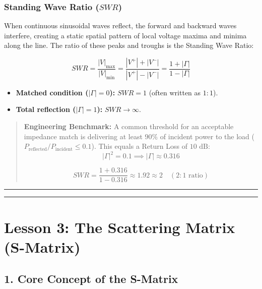 \documentclass[
]{article}
\providecommand{\tightlist}{%
  \setlength{\itemsep}{0pt}\setlength{\parskip}{0pt}}
\begin{document}
\subsubsection{\texorpdfstring{Standing Wave Ratio
(\(SWR\))}{Standing Wave Ratio (SWR)}}\label{standing-wave-ratio-swr}

When continuous sinusoidal waves reflect, the forward and backward waves
interfere, creating a static spatial pattern of local voltage maxima and
minima along the line. The ratio of these peaks and troughs is the
Standing Wave Ratio:

\[SWR = \frac{|V|_{\text{max}}}{|V|_{\text{min}}} = \frac{|V^+| + |V^-|}{|V^+| - |V^-|} = \frac{1 + |\Gamma|}{1 - |\Gamma|}\]

\begin{itemize}
\tightlist
\item
  \textbf{Matched condition (\(|\Gamma| = 0\)):} \(SWR = 1\) (often
  written as \(1:1\)).
\item
  \textbf{Total reflection (\(|\Gamma| = 1\)):} \(SWR \to \infty\).
\end{itemize}

\begin{quote}
\textbf{Engineering Benchmark:} A common threshold for an acceptable
impedance match is delivering at least \(90\%\) of incident power to the
load (\(P_{\text{reflected}}/P_{\text{incident}} \le 0.1\)). This equals
a Return Loss of \(10\text{ dB}\):
\[|\Gamma|^2 = 0.1 \implies |\Gamma| \approx 0.316\]

\[SWR = \frac{1 + 0.316}{1 - 0.316} \approx 1.92 \approx 2 \quad (2:1 \text{ ratio})\]
\end{quote}

\begin{center}\rule{0.5\linewidth}{0.5pt}\end{center}

\begin{center}\rule{0.5\linewidth}{0.5pt}\end{center}

\section{Lesson 3: The Scattering Matrix
(S-Matrix)}\label{lesson-3-the-scattering-matrix-s-matrix}

\subsection{1. Core Concept of the
S-Matrix}\label{core-concept-of-the-s-matrix}
\end{document}

